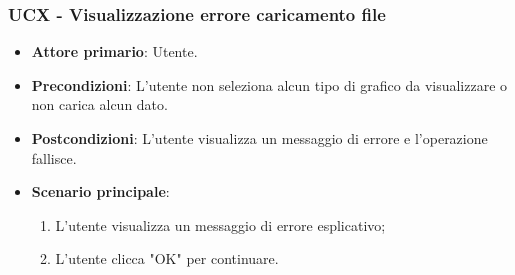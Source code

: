 \subsubsection{UCX - Visualizzazione errore caricamento file}
\begin{itemize}
	\item \textbf{Attore primario}: Utente.
	\item \textbf{Precondizioni}: L'utente non seleziona alcun tipo di grafico da visualizzare o non carica alcun dato.
	\item \textbf{Postcondizioni}: L'utente visualizza un messaggio di errore e l'operazione fallisce.
	\item \textbf{Scenario principale}:
		\begin{enumerate}
			\item L'utente visualizza un messaggio di errore esplicativo;
			\item L'utente clicca "OK" per continuare.
		\end{enumerate}
\end{itemize}